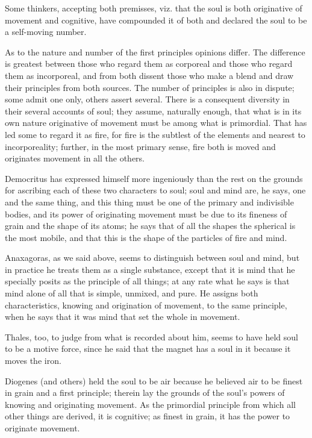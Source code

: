 Some thinkers, accepting both premisses, viz. that the soul is both
originative of movement and cognitive, have compounded it of both
and declared the soul to be a self-moving number. 

As to the nature and number of the first principles opinions differ.
The difference is greatest between those who regard them as corporeal
and those who regard them as incorporeal, and from both dissent those
who make a blend and draw their principles from both sources. The
number of principles is also in dispute; some admit one only, others
assert several. There is a consequent diversity in their several accounts
of soul; they assume, naturally enough, that what is in its own nature
originative of movement must be among what is primordial. That has
led some to regard it as fire, for fire is the subtlest of the elements
and nearest to incorporeality; further, in the most primary sense,
fire both is moved and originates movement in all the others.

Democritus has expressed himself more ingeniously than the rest on
the grounds for ascribing each of these two characters to soul; soul
and mind are, he says, one and the same thing, and this thing must
be one of the primary and indivisible bodies, and its power of originating
movement must be due to its fineness of grain and the shape of its
atoms; he says that of all the shapes the spherical is the most mobile,
and that this is the shape of the particles of fire and mind.

Anaxagoras, as we said above, seems to distinguish between soul and
mind, but in practice he treats them as a single substance, except
that it is mind that he specially posits as the principle of all things;
at any rate what he says is that mind alone of all that is simple,
unmixed, and pure. He assigns both characteristics, knowing and origination
of movement, to the same principle, when he says that it was mind
that set the whole in movement. 

Thales, too, to judge from what is recorded about him, seems to have
held soul to be a motive force, since he said that the magnet has
a soul in it because it moves the iron. 

Diogenes (and others) held the soul to be air because he believed
air to be finest in grain and a first principle; therein lay the grounds
of the soul's powers of knowing and originating movement. As the primordial
principle from which all other things are derived, it is cognitive;
as finest in grain, it has the power to originate movement.

